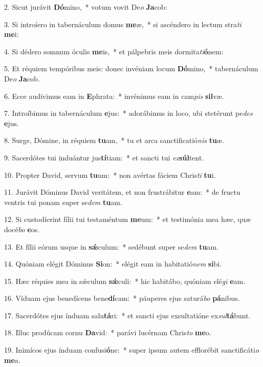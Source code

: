 2. Sicut jurávit \textbf{Dó}mino,~*  votum vovit De\textit{o} \textbf{Ja}cob:\

3. Si introíero in tabernáculum domus \textbf{me}æ,~*  si ascéndero in lectum stra\textit{ti} \textbf{me}i:\

4. Si dédero somnum óculis \textbf{me}is,~*  et pálpebris meis dormita\textit{ti}\textbf{ó}nem:\

5. Et réquiem tempóribus meis: donec invéniam locum \textbf{Dó}mino,~*  tabernáculum De\textit{o} \textbf{Ja}cob.\

6. Ecce audívimus eam in \textbf{E}phrata:~*  invénimus eam in cam\textit{pis} \textbf{sil}væ.\

7. Introíbimus in tabernáculum \textbf{e}jus:~*  adorábimus in loco, ubi stetérunt pe\textit{des} \textbf{e}jus.\

8. Surge, Dómine, in réquiem \textbf{tu}am,~*  tu et arca sanctificatió\textit{nis} \textbf{tu}æ.\

9. Sacerdótes tui induántur jus\textbf{tí}tiam:~*  et sancti tui \textit{ex}\textbf{súl}tent.\

10. Propter David, servum \textbf{tu}um:~*  non avértas fáciem Chris\textit{ti} \textbf{tu}i.\

11. Jurávit Dóminus David veritátem, et non frustrábitur \textbf{e}am:~*  de fructu ventris tui ponam super se\textit{dem} \textbf{tu}am.\

12. Si custodíerint fílii tui testaméntum \textbf{me}um:~*  et testimónia mea hæc, quæ docé\textit{bo} \textbf{e}os.\

13. Et fílii eórum usque in \textbf{sǽ}culum:~*  sedébunt super se\textit{dem} \textbf{tu}am.\

14. Quóniam elégit Dóminus \textbf{Si}on:~*  elégit eam in habitatió\textit{nem} \textbf{si}bi.\

15. Hæc réquies mea in sǽculum \textbf{sǽ}culi:~*  hic habitábo, quóniam elé\textit{gi} \textbf{e}am.\

16. Víduam ejus benedícens bene\textbf{dí}cam:~*  páuperes ejus saturá\textit{bo} \textbf{pá}nibus.\

17. Sacerdótes ejus índuam salu\textbf{tá}ri:~*  et sancti ejus exsultatióne ex\textit{sul}\textbf{tá}bunt.\

18. Illuc prodúcam cornu \textbf{Da}vid:~*  parávi lucérnam Chris\textit{to} \textbf{me}o.\

19. Inimícos ejus índuam confusi\textbf{ó}ne:~*  super ipsum autem efflorébit sanctificáti\textit{o} \textbf{me}a.\

